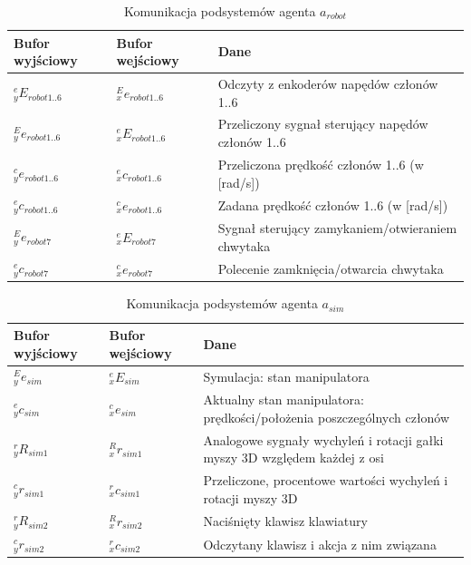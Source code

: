 \documentclass[a4paper, 12pt, twoside]{article}
\begin{document}
\begin{table}[htb!]
\label{comrobot}
\begin{center}
\caption{Komunikacja podsystemów agenta $a_{robot}$}
\begin{tabular}{ | l | l | p{6cm} |}
\hline
 Bufor wyjściowy & Bufor wejściowy & Dane \\ 
\hline
 $^e_yE_{robot1..6}$ & $^E_xe_{robot1..6}$ & Odczyty z enkoderów napędów członów 1..6\\ 
\hline
 $^E_ye_{robot1..6}$ & $^e_xE_{robot1..6}$ & Przeliczony sygnał sterujący napędów członów 1..6\\
\hline
 $^c_ye_{robot1..6}$ & $^e_xc_{robot1..6}$ & Przeliczona prędkość członów 1..6 (w [rad/s]) \\
\hline
 $^e_yc_{robot1..6}$ & $^c_xe_{robot1..6}$ & Zadana prędkość członów 1..6 (w [rad/s])\\ 
\hline
 $^E_ye_{robot7}$ & $^e_xE_{robot7}$ & Sygnał sterujący zamykaniem/otwieraniem chwytaka \\
\hline
 $^e_yc_{robot7}$ & $^c_xe_{robot7}$ & Polecenie zamknięcia/otwarcia chwytaka \\ 
\hline
\end{tabular}
\end{center}
\end{table}

\begin{table}[htb!]
\label{comsim}
\begin{center}
\caption{Komunikacja podsystemów agenta $a_{sim}$}
\begin{tabular}{ | l | l | p{6cm} |}
\hline
 Bufor wyjściowy & Bufor wejściowy & Dane \\ 
\hline
 $^E_ye_{sim}$ & $^e_xE_{sim}$ & Symulacja: stan manipulatora \\ 
\hline
 $^e_yc_{sim}$ & $^c_xe_{sim}$ & Aktualny stan manipulatora: prędkości/położenia poszczególnych członów \\
\hline
 $^r_yR_{sim1}$ & $^R_xr_{sim1}$ & Analogowe sygnały wychyleń i rotacji gałki myszy 3D względem każdej z osi \\
\hline
 $^c_yr_{sim1}$ & $^r_xc_{sim1}$ & Przeliczone, procentowe wartości wychyleń i rotacji myszy 3D \\ 
\hline
 $^r_yR_{sim2}$ & $^R_xr_{sim2}$ & Naciśnięty klawisz klawiatury \\
\hline
 $^c_yr_{sim2}$ & $^r_xc_{sim2}$ & Odczytany klawisz i akcja z nim związana \\ 
\hline
\end{tabular}
\end{center}
\end{table}
\end{document}
